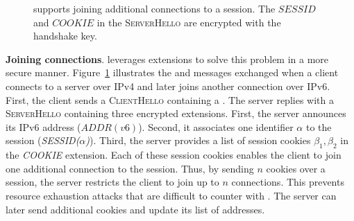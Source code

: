 \begin{figure}[!t]
	\centering
	\caption{\tcpls supports joining additional \tcp
		connections to a \tcpls session. The $SESSID$ and $COOKIE$ in the \textmd{\textsc{ServerHello}} are encrypted with the
		handshake key.}
	\label{fig:join-example}
\end{figure}

\textbf{Joining \tcp connections}. \tcpls leverages \tls
extensions to solve this problem in a more secure manner. 
Figure~\ref{fig:join-example} illustrates the \tls and \tcpls messages 
exchanged when a client connects to a server over IPv4 and later joins another 
connection over IPv6.
First, the client sends a \textsc{ClientHello} containing a \hello. The server 
replies with a \textsc{ServerHello} containing three encrypted extensions. 
First, the server announces its IPv6 address ($ADDR(v6)$). Second, it 
associates one identifier $\alpha$ to the \tcpls session 
(\emph{SESSID($\alpha$)}).
Third, the server provides a list of \tcpls session cookies $\beta_1,\beta_2$ in the \emph{COOKIE} extension. Each of these session cookies enables the client
to join one additional \tcp connection to the \tcpls session. Thus, by 
sending $n$ cookies over a session, the server restricts the client to 
join up to $n$ \tcp connections. This prevents resource exhaustion attacks
that are difficult to counter with \mptcp. The server can later send additional
cookies and update its list of addresses.

